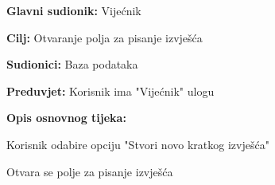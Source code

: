 					\begin{packed_item}
	
						\item \textbf{Glavni sudionik: }Vijećnik
						\item  \textbf{Cilj:} Otvaranje polja za pisanje izvješća
						\item  \textbf{Sudionici:} Baza podataka
						\item  \textbf{Preduvjet:} Korisnik ima "Vijećnik" ulogu
						\item  \textbf{Opis osnovnog tijeka:}
						
						\item[] \begin{packed_enum}
	
							\item Korisnik odabire opciju "Stvori novo kratkog izvješća" 
							\item Otvara se polje za pisanje izvješća
							
							
						\end{packed_enum}
						
						
					\end{packed_item}					
					\noindent {}

